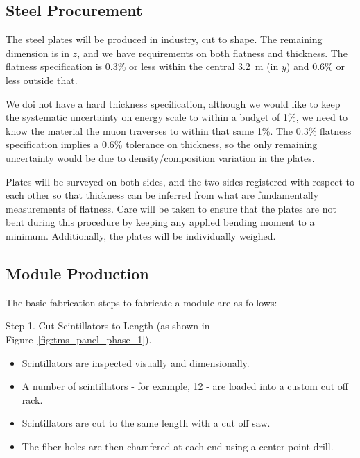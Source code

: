 \subsection{Steel Procurement}

The steel plates will be produced in industry, cut to shape. The remaining dimension is in $z$, and we have requirements on both flatness and thickness. The flatness specification is 0.3\% or less within the central 3.2~m (in $y$) and 0.6\% or less outside that.

We doi not have a hard thickness specification, although we would like to keep the systematic uncertainty on energy scale to within a budget of 1\%, we need to know the material the muon traverses to within that same 1\%. The 0.3\% flatness specification implies a 0.6\% tolerance on thickness, so the only remaining uncertainty would be due to density/composition variation in the plates.

Plates will be surveyed on both sides, and the two sides registered with respect to each other so that thickness can be inferred from what are fundamentally measurements of flatness. Care will be taken to ensure that the plates are not bent during this procedure by keeping any applied bending moment to a minimum. Additionally, the plates will be individually weighed.

\subsection{Module Production}
The basic fabrication steps to fabricate a module are as follows:

Step 1. Cut Scintillators to Length (as shown in Figure~\ref{fig:tms_panel_phase_1}).
\begin{itemize}
\item{Scintillators are inspected visually and dimensionally.}
\item{A number of scintillators - for example, 12 - are loaded into a custom cut off rack.}
\item{Scintillators are cut to the same length with a cut off saw.}
\item{The fiber holes are then chamfered at each end using a center point drill.}
\end{itemize}

